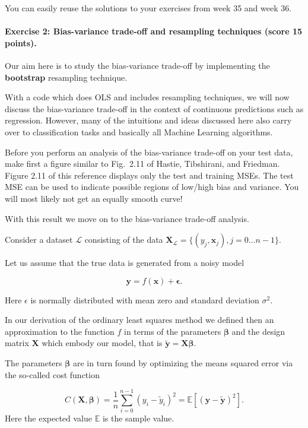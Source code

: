 \documentclass[%
oneside,                 %
final,                   %
10pt]{article}
\begin{document}
You can easily reuse the solutions to your exercises from week 35 and week 36.



\paragraph{Exercise 2: Bias-variance trade-off and resampling techniques (score 15 points).}
Our aim here is to study the bias-variance trade-off by implementing the \textbf{bootstrap} resampling technique.

With a code which does OLS and includes resampling techniques, 
we will now discuss the bias-variance trade-off in the context of
continuous predictions such as regression. However, many of the
intuitions and ideas discussed here also carry over to classification
tasks and basically all Machine Learning algorithms. 

Before you perform an analysis of the bias-variance trade-off on your test data, make
first a figure similar to Fig.~2.11 of Hastie, Tibshirani, and
Friedman. Figure 2.11 of this reference displays only the test and training MSEs. The test MSE can be used to 
indicate possible regions of low/high bias and variance. You will most likely not get an
equally smooth curve!

With this result we move on to the bias-variance trade-off analysis.

Consider a
dataset $\mathcal{L}$ consisting of the data
$\mathbf{X}_\mathcal{L}=\{(y_j, \boldsymbol{x}_j), j=0\ldots n-1\}$.

Let us assume that the true data is generated from a noisy model

\[
\bm{y}=f(\boldsymbol{x}) + \bm{\epsilon}.
\]

Here $\epsilon$ is normally distributed with mean zero and standard
deviation $\sigma^2$.

In our derivation of the ordinary least squares method we defined then
an approximation to the function $f$ in terms of the parameters
$\bm{\beta}$ and the design matrix $\bm{X}$ which embody our model,
that is $\bm{\tilde{y}}=\bm{X}\bm{\beta}$.

The parameters $\bm{\beta}$ are in turn found by optimizing the means
squared error via the so-called cost function

\[
C(\bm{X},\bm{\beta}) =\frac{1}{n}\sum_{i=0}^{n-1}(y_i-\tilde{y}_i)^2=\mathbb{E}\left[(\bm{y}-\bm{\tilde{y}})^2\right].
\]
Here the expected value $\mathbb{E}$ is the sample value. 
\end{document}
